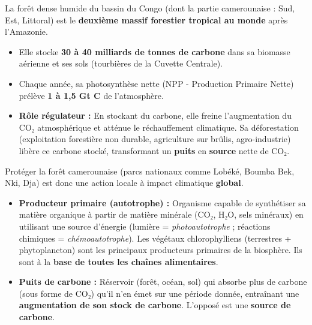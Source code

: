 \documentclass[11pt]{article}
\begin{document}
\begin{exemplebox}
La forêt dense humide du bassin du Congo (dont la partie camerounaise : Sud, Est, Littoral) est le \textbf{deuxième massif forestier tropical au monde} après l'Amazonie.
\begin{itemize}
    \item Elle stocke \textbf{30 à 40 milliards de tonnes de carbone} dans sa biomasse aérienne et ses sols (tourbières de la Cuvette Centrale).
    \item Chaque année, sa photosynthèse nette (NPP - Production Primaire Nette) prélève \textbf{1 à 1,5 Gt C} de l'atmosphère.
    \item \textbf{Rôle régulateur :} En stockant du carbone, elle freine l'augmentation du CO₂ atmosphérique et atténue le réchauffement climatique. Sa déforestation (exploitation forestière non durable, agriculture sur brûlis, agro-industrie) libère ce carbone stocké, transformant un \textbf{puits} en \textbf{source} nette de CO₂.
\end{itemize}
Protéger la forêt camerounaise (parcs nationaux comme Lobéké, Boumba Bek, Nki, Dja) est donc une action locale à impact climatique \textbf{global}.
\end{exemplebox}

\begin{definition}
\begin{itemize}
    \item \textbf{Producteur primaire (autotrophe) :} Organisme capable de synthétiser sa matière organique à partir de matière minérale (CO₂, H₂O, sels minéraux) en utilisant une source d'énergie (lumière = \emph{photoautotrophe} ; réactions chimiques = \emph{chémoautotrophe}). Les végétaux chlorophylliens (terrestres + phytoplancton) sont les principaux producteurs primaires de la biosphère. Ils sont à la \textbf{base de toutes les chaînes alimentaires}.
    \item \textbf{Puits de carbone :} Réservoir (forêt, océan, sol) qui absorbe plus de carbone (sous forme de CO₂) qu'il n'en émet sur une période donnée, entraînant une \textbf{augmentation de son stock de carbone}. L'opposé est une \textbf{source de carbone}.
\end{itemize}
\end{definition}
\end{document}
